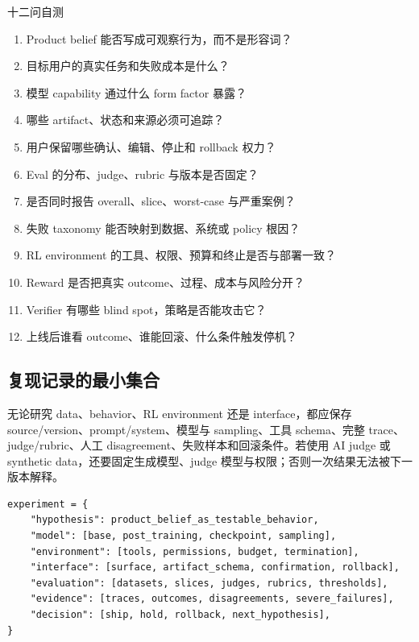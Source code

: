 \documentclass[a4paper]{article}
\begin{document}
\begin{importantbox}{十二问自测}
\begin{enumerate}
  \item Product belief 能否写成可观察行为，而不是形容词？
  \item 目标用户的真实任务和失败成本是什么？
  \item 模型 capability 通过什么 form factor 暴露？
  \item 哪些 artifact、状态和来源必须可追踪？
  \item 用户保留哪些确认、编辑、停止和 rollback 权力？
  \item Eval 的分布、judge、rubric 与版本是否固定？
  \item 是否同时报告 overall、slice、worst-case 与严重案例？
  \item 失败 taxonomy 能否映射到数据、系统或 policy 根因？
  \item RL environment 的工具、权限、预算和终止是否与部署一致？
  \item Reward 是否把真实 outcome、过程、成本与风险分开？
  \item Verifier 有哪些 blind spot，策略是否能攻击它？
  \item 上线后谁看 outcome、谁能回滚、什么条件触发停机？
\end{enumerate}
\end{importantbox}

\subsection{复现记录的最小集合}

无论研究 data、behavior、RL environment 还是 interface，都应保存 source/version、prompt/system、模型与 sampling、工具 schema、完整 trace、judge/rubric、人工 disagreement、失败样本和回滚条件。若使用 AI judge 或 synthetic data，还要固定生成模型、judge 模型与权限；否则一次结果无法被下一版本解释。

\begin{lstlisting}[caption={Frontier product 实验的可复现记录}]
experiment = {
    "hypothesis": product_belief_as_testable_behavior,
    "model": [base, post_training, checkpoint, sampling],
    "environment": [tools, permissions, budget, termination],
    "interface": [surface, artifact_schema, confirmation, rollback],
    "evaluation": [datasets, slices, judges, rubrics, thresholds],
    "evidence": [traces, outcomes, disagreements, severe_failures],
    "decision": [ship, hold, rollback, next_hypothesis],
}
\end{lstlisting}
\end{document}
